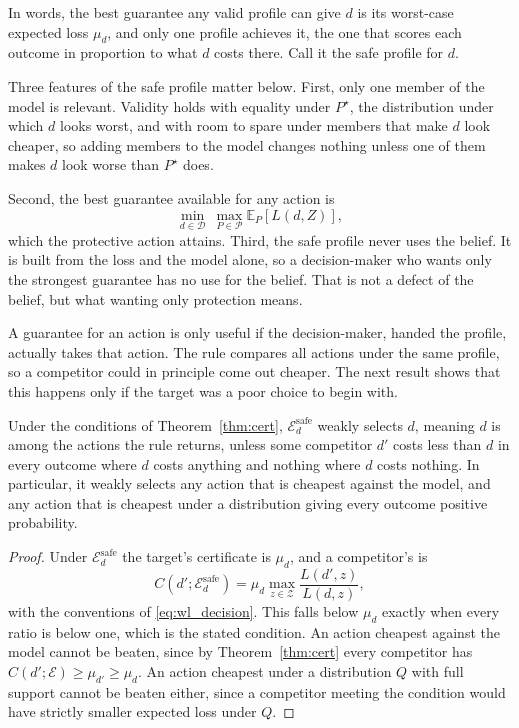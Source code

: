 In words, the best guarantee any valid profile can give $d$ is its
worst-case expected loss $\mu_d$, and only one profile achieves it, the one
that scores each outcome in proportion to what $d$ costs there. Call it the
safe profile for $d$.

Three features of the safe profile matter below. First, only one member of
the model is relevant. Validity holds with equality under $P^\star$, the
distribution under which $d$ looks worst, and with room to spare under members
that make $d$ look cheaper, so adding members to the model changes nothing
unless one of them makes $d$ look worse than $P^\star$ does.

Second, the best
guarantee available for any action is
\[
  \min_{d\in\mathcal D}\ \max_{P\in\mathcal P}\mathbb E_{P}[L(d,Z)],
\]
which the protective action attains. Third, the safe profile never uses the
belief. It is built from the loss and the model alone, so a decision-maker who
wants only the strongest guarantee has no use for the belief. That is not a
defect of the belief, but what wanting only protection means.

A guarantee for an action is only useful if the decision-maker, handed the
profile, actually takes that action. The rule compares all actions under the
same profile, so a competitor could in principle come out cheaper. The next
result shows that this happens only if the target was a poor choice to begin
with.

\begin{corollary}\label{cor:select}
Under the conditions of Theorem~\ref{thm:cert}, $\mathcal E_d^{\mathrm{safe}}$
weakly selects $d$, meaning $d$ is among the actions the rule returns,
unless some competitor $d'$ costs less than $d$ in every outcome where $d$ costs anything and nothing where $d$ costs nothing. In
particular, it weakly selects any action that is cheapest against the model,
and any action that is cheapest under a distribution giving every outcome
positive probability.
\end{corollary}

\begin{proof}
Under $\mathcal E_d^{\mathrm{safe}}$ the target's certificate is $\mu_d$, and
a competitor's is
\[
  C(d';\mathcal E_d^{\mathrm{safe}})
  =\mu_d\max_{z\in\mathcal Z}\frac{L(d',z)}{L(d,z)},
\]
with the conventions of \eqref{eq:wl_decision}. This falls below $\mu_d$
exactly when every ratio is below one, which is the stated condition. An
action cheapest against the model cannot be beaten, since by
Theorem~\ref{thm:cert} every competitor has
$C(d';\mathcal E)\geq\mu_{d'}\geq\mu_d$. An action cheapest under a
distribution $Q$ with full support cannot be beaten either, since a competitor
meeting the condition would have strictly smaller expected loss under $Q$.
\end{proof}


